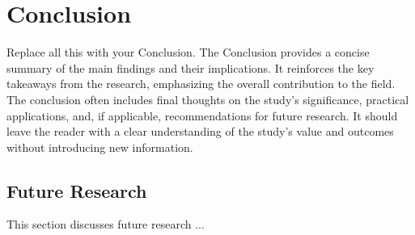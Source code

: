 \section{Conclusion}
\label{Conclusion}

Replace all this with your Conclusion.  The Conclusion provides a concise summary of the main findings and their implications. It reinforces the key takeaways from the research, emphasizing the overall contribution to the field. The conclusion often includes final thoughts on the study’s significance, practical applications, and, if applicable, recommendations for future research. It should leave the reader with a clear understanding of the study’s value and outcomes without introducing new information.

\subsection{Future Research}
This section discusses future research ...
